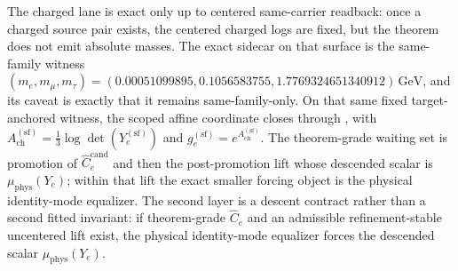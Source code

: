 The charged lane is exact only up to centered same-carrier readback: once a charged source pair exists, the centered charged logs are fixed, but the theorem does not emit absolute masses. The exact sidecar on that surface is the same-family witness \((m_e,m_\mu,m_\tau)=(0.00051099895,0.1056583755,1.7769324651340912)\,\mathrm{GeV}\), and its caveat is exactly that it remains same-family-only. On that same fixed target-anchored witness, the scoped affine coordinate closes through , with \(A_{\mathrm{ch}}^{(\mathrm{sf})}=\tfrac13\log\det(Y_e^{(\mathrm{sf})})\) and \(g_e^{(\mathrm{sf})}=e^{A_{\mathrm{ch}}^{(\mathrm{sf})}}\). The theorem-grade waiting set is promotion of \(\widehat C_e^{\mathrm{cand}}\) and then the post-promotion lift whose descended scalar is \(\mu_{\mathrm{phys}}(Y_e)\); within that lift the exact smaller forcing object is the physical identity-mode equalizer.
The second layer is a descent contract rather than a second fitted invariant: if theorem-grade \(\widehat C_e\) and an admissible refinement-stable uncentered lift exist, the physical identity-mode equalizer forces the descended scalar \(\mu_{\mathrm{phys}}(Y_e)\).


